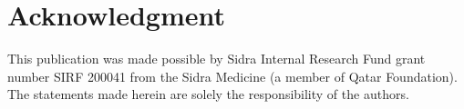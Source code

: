 \documentclass[conference,a4paper]{IEEEtran}
\begin{document}
\section*{Acknowledgment}
%
This publication was made possible by Sidra Internal Research Fund grant number SIRF 200041 from the
Sidra Medicine (a member of Qatar Foundation). The statements made herein are solely the responsibility of the authors.







%
%
%
\vspace{7pt}



% 



\end{document}
